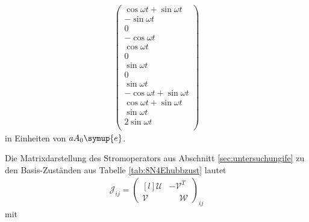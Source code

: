 \begin{align*}
\begin{pmatrix}
    \cos{\omega t}  +\sin{\omega t} \\
    -\sin{\omega t} \\
    0                                    \\
    -\cos{\omega t}                    \\
    \cos{\omega t}                    \\
    0                                    \\
    \sin{\omega t} \\
    0                                    \\
    \sin{\omega t} \\
    -\cos{\omega t}  +\sin{\omega t} \\
    \cos{\omega t}  +\sin{\omega t} \\
    \sin{\omega t} \\
    2 \sin{\omega t} \\
  \end{pmatrix}
\end{align*}
in Einheiten von $a A_0 \symup{e}$.

Die Matrixdarstellung des Stromoperators aus Abschnitt \ref{sec:untersuchungife} zu den Basis-Zuständen aus Tabelle \ref{tab:8N4Ehubbzust} lautet
\begin{align}
\mathcal{J}_{ij} =
\begin{pmatrix*}[l]
   \mathcal{U} & -\mathcal{V}^T \\
   \mathcal{V} & \phantom{-}\mathcal{W}
\end{pmatrix*}_{ij}
\label{eqn:strommatrix}
\end{align}
mit


